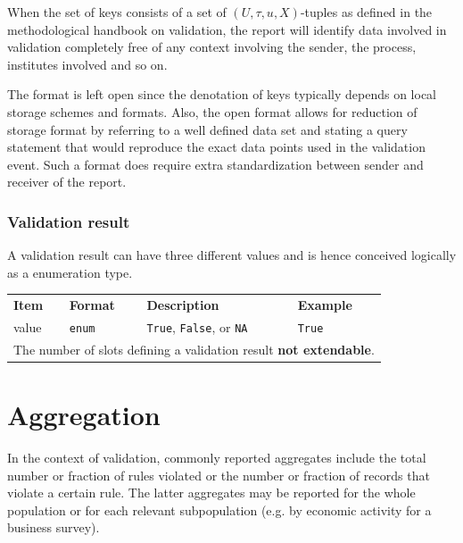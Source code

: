 \documentclass[a4paper, 11pt,titlepage]{article}
\newcommand{\code}[1]{\texttt{#1}}
\newcommand{\waar}{{\normalfont \texttt{True}}}
\newcommand{\onwaar}{{\normalfont \texttt{False}}}
\newcommand{\na}{{\normalfont \texttt{NA}}}
\begin{document}
When the set of keys consists of a set of $(U,\tau,u,X)$-tuples as defined in
the methodological handbook on validation, the report will identify data
involved in validation completely free of any context involving the sender, the
process, institutes involved and so on. 

The format is left open since the denotation of keys typically depends on
local storage schemes and formats. Also, the open format allows for reduction
of storage format by referring to a well defined data set and stating a query
statement that would reproduce the exact data points used in the validation
event. Such a format does require extra standardization between sender and
receiver of the report.


\subsubsection{Validation result}
\label{sect:valres}
A validation result can have three different values and is hence conceived
logically as a enumeration type.
\begin{center}
\begin{tabular}{|lp{15mm}p{}p{}|}
\hline
\textbf{Item} & \textbf{Format} & \textbf{Description} &\textbf{Example}\\
value  & \code{enum} & \waar{}, \onwaar{}, or \na{}    &\waar{}\\
\hline
\multicolumn{4}{|l|}{The number of slots defining a validation result \textbf{not extendable}.
}\\
\hline
\end{tabular}
\end{center}







\section{Aggregation}
In the context of validation, commonly reported aggregates include the total
number or fraction of rules violated or the number or fraction of records  that
violate a certain rule. The latter aggregates may be reported for the whole
population or for each relevant subpopulation (e.g. by economic activity for a
business survey). 
\end{document}
